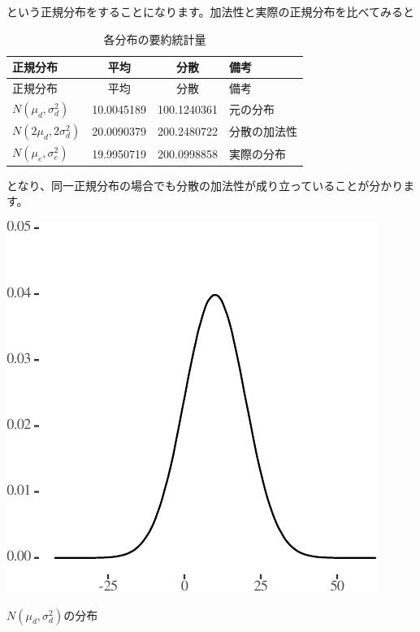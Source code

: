 \documentclass[a4paper]{tufte-handout}
\begin{document}
という正規分布をすることになります。加法性と実際の正規分布を比べてみると

\begin{longtable}[]{@{}lccl@{}}
\caption{各分布の要約統計量}\tabularnewline
\toprule
正規分布 & 平均 & 分散 & 備考 \\
\midrule
\endfirsthead
\toprule
正規分布 & 平均 & 分散 & 備考 \\
\midrule
\endhead
\(N(\mu_d, \sigma^2_d)\) & 10.0045189 & 100.1240361 & 元の分布 \\
\(N(2\mu_d, 2\sigma^2_d)\) & 20.0090379 & 200.2480722 & 分散の加法性 \\
\(N(\mu_e, \sigma^2_e)\) & 19.9950719 & 200.0998858 & 実際の分布 \\
\bottomrule
\end{longtable}

となり、同一正規分布の場合でも分散の加法性が成り立っていることが分かります。

\begin{marginfigure}

{\centering \includegraphics{AdditivityOfVariance_files/figure-latex/unnamed-chunk-8-1} 

}

\caption[$N(\mu_d, \sigma^2_d)$の分布]{$N(\mu_d, \sigma^2_d)$の分布}\label{fig:unnamed-chunk-8}
\end{marginfigure}
\end{document}
